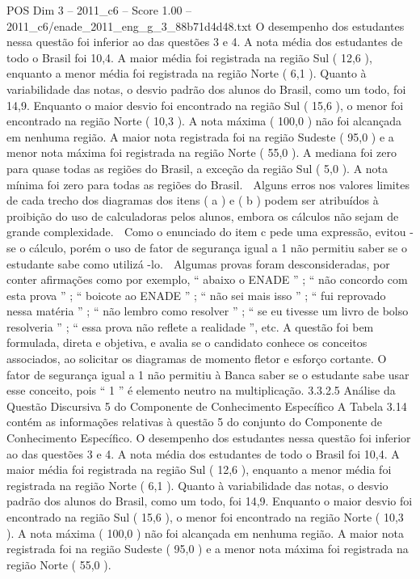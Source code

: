 \begin{textsample}{POS Dim 3 – 2011\_c6 – Score 1.00 – 2011\_c6/enade\_2011\_eng\_g\_3\_88b71d4d48.txt}
O desempenho dos estudantes nessa questão foi inferior ao das questões 3 e 4.
A nota média dos estudantes de todo o Brasil foi 10,4.
A maior média foi registrada na região Sul ( 12,6 ), enquanto a menor média foi registrada na região Norte ( 6,1 ).
Quanto à variabilidade das notas, o desvio padrão dos alunos do Brasil, como um todo, foi 14,9.
Enquanto o maior desvio foi encontrado na região Sul ( 15,6 ), o menor foi encontrado na região Norte ( 10,3 ).
A nota máxima ( 100,0 ) não foi alcançada em nenhuma região.
A maior nota registrada foi na região Sudeste ( 95,0 ) e a menor nota máxima foi registrada na região Norte ( 55,0 ).
A mediana foi zero para quase todas as regiões do Brasil, a exceção da região Sul ( 5,0 ).
A nota mínima foi zero para todas as regiões do Brasil.  Alguns erros nos valores limites de cada trecho dos diagramas dos itens ( a ) e ( b ) podem ser atribuídos à proibição do uso de calculadoras pelos alunos, embora os cálculos não sejam de grande complexidade.  Como o enunciado do item c pede uma expressão, evitou -se o cálculo, porém o uso de fator de segurança igual a 1 não permitiu saber se o estudante sabe como utilizá -lo.  Algumas provas foram desconsideradas, por conter afirmações como por exemplo, “ abaixo o ENADE ” ; “ não concordo com esta prova ” ; “ boicote ao ENADE ” ; “ não sei mais isso ” ; “ fui reprovado nessa matéria ” ; “ não lembro como resolver ” ; “ se eu tivesse um livro de bolso resolveria ” ; “ essa prova não reflete a realidade ”, etc.
A questão foi bem formulada, direta e objetiva, e avalia se o candidato conhece os conceitos associados, ao solicitar os diagramas de momento fletor e esforço cortante.
O fator de segurança igual a 1 não permitiu à Banca saber se o estudante sabe usar esse conceito, pois “ 1 ” é elemento neutro na multiplicação. 3.3.2.5 Análise da Questão Discursiva 5 do Componente de Conhecimento Específico A Tabela 3.14 contém as informações relativas à questão 5 do conjunto do Componente de Conhecimento Específico.
O desempenho dos estudantes nessa questão foi inferior ao das questões 3 e 4.
A nota média dos estudantes de todo o Brasil foi 10,4.
A maior média foi registrada na região Sul ( 12,6 ), enquanto a menor média foi registrada na região Norte ( 6,1 ).
Quanto à variabilidade das notas, o desvio padrão dos alunos do Brasil, como um todo, foi 14,9.
Enquanto o maior desvio foi encontrado na região Sul ( 15,6 ), o menor foi encontrado na região Norte ( 10,3 ).
A nota máxima ( 100,0 ) não foi alcançada em nenhuma região.
A maior nota registrada foi na região Sudeste ( 95,0 ) e a menor nota máxima foi registrada na região Norte ( 55,0 ).

\end{textsample}
